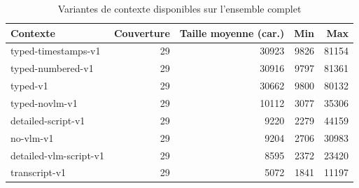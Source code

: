 \begin{table}[ht]
\centering
\small
\caption{Variantes de contexte disponibles sur l'ensemble complet}
\label{tab:context-variants}
\begin{tabularx}{\textwidth}{>{\raggedright\arraybackslash}Xrrrr}
\toprule
Contexte & Couverture & Taille moyenne (car.) & Min & Max \\
\midrule
typed-timestamps-v1 & 29 & 30923 & 9826 & 81154 \\
typed-numbered-v1 & 29 & 30916 & 9797 & 81361 \\
typed-v1 & 29 & 30662 & 9800 & 80132 \\
typed-novlm-v1 & 29 & 10112 & 3077 & 35306 \\
detailed-script-v1 & 29 & 9220 & 2279 & 44159 \\
no-vlm-v1 & 29 & 9204 & 2706 & 30983 \\
detailed-vlm-script-v1 & 29 & 8595 & 2372 & 23420 \\
transcript-v1 & 29 & 5072 & 1841 & 11197 \\
\bottomrule
\end{tabularx}
\end{table}
